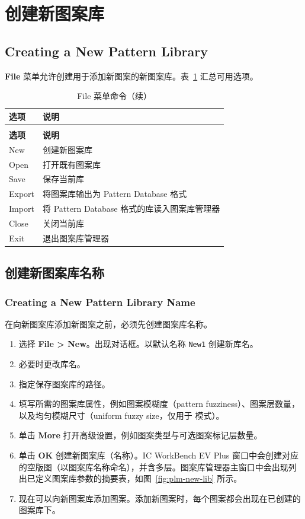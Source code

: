 \section{创建新图案库}
\subsection*{Creating a New Pattern Library}

\textbf{File} 菜单允许创建用于添加新图案的新图案库。表~\ref{tab:plm-file-menu} 汇总可用选项。

\begin{longtable}{@{}p{} p{}@{}}
\caption{File 菜单命令}\label{tab:plm-file-menu}\\
\toprule
\textbf{选项} & \textbf{说明} \\
\midrule
\endfirsthead
\caption[]{File 菜单命令（续）}\\
\toprule
\textbf{选项} & \textbf{说明} \\
\midrule
\endhead
\bottomrule
\endfoot
New
  & 创建新图案库 \\
Open
  & 打开既有图案库 \\
Save
  & 保存当前库 \\
Export
  & 将图案库输出为 Pattern Database 格式 \\
Import
  & 将 Pattern Database 格式的库读入图案库管理器 \\
Close
  & 关闭当前库 \\
Exit
  & 退出图案库管理器 \\
\end{longtable}

\subsection{创建新图案库名称}
\subsubsection*{Creating a New Pattern Library Name}

在向新图案库添加新图案之前，必须先创建图案库名称。

\begin{enumerate}
  \item 选择 \textbf{File > New}。出现对话框。以默认名称 \texttt{New1} 创建新库名。
  \item 必要时更改库名。
  \item 指定保存图案库的路径。
  \item 填写所需的图案库属性，例如图案模糊度（pattern fuzziness）、图案层数量，以及均匀模糊尺寸（uniform fuzzy size，仅用于  模式）。
  \item 单击 \textbf{More} 打开高级设置，例如图案类型与可选图案标记层数量。
  \item 单击 \textbf{OK} 创建新图案库（名称）。IC WorkBench EV Plus 窗口中会创建对应的空版图（以图案库名称命名），并含多层。图案库管理器主窗口中会出现列出已定义图案库参数的摘要表，如图~\ref{fig:plm-new-lib} 所示。
  \item 现在可以向新图案库添加图案。添加新图案时，每个图案都会出现在已创建的图案库下。
\end{enumerate}

